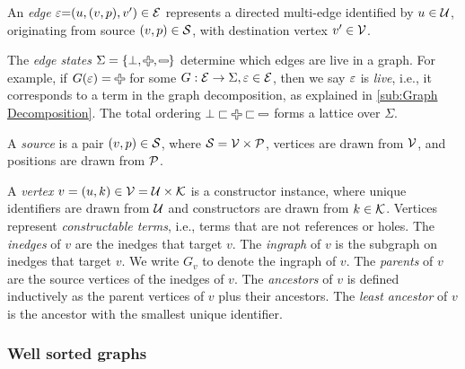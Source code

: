 An \emph{edge} $\e{=}(u, (v, p), v^\prime) \in \E$ represents a directed multi-edge
identified by $u \in \U$, originating from source $(v, p) \in \S$, with destination vertex $v' \in \V$.

The \emph{edge states} $\Sigma = \SetOf{\bot, \Plus, \Minus}$ determine which edges are live in a graph.
For example, if $G(\e) = \Plus$ for some $G : \E \rightarrow \Sigma, \e \in \E$,
then we say $\e$ is \emph{live}, i.e., it corresponds to a term in the graph decomposition, as explained in \autoref{sub:Graph Decomposition}.
The total ordering $\bot \sqsubset \Plus \sqsubset \Minus$ forms a lattice over $\Sigma$.

A \emph{source} is a pair $(v, p) \in \S$,
  where $\S = \V \times \P$,
  vertices are drawn from $\V$,
  and positions are drawn from $\P$.

A \emph{vertex} $v = (u, k) \in \V = \U \times \K$ is a constructor instance,
  where unique identifiers are drawn from $\U$
  and constructors are drawn from $k \in \K$.
Vertices represent \emph{constructable terms}, i.e., terms that are not references or holes.
The \emph{inedges} of $v$ are the inedges that target $v$.
The \emph{ingraph} of $v$ is the subgraph on inedges that target $v$.
We write $G_v$ to denote the ingraph of $v$.
The \emph{parents} of $v$ are the source vertices of the inedges of $v$.
The \emph{ancestors} of $v$ is defined inductively as the parent vertices of $v$ plus their ancestors.
The \emph{least ancestor} of $v$ is the ancestor with the smallest unique identifier.


\subsubsection{Well sorted graphs}
\label{sub:Well sorted graphs}

% 


